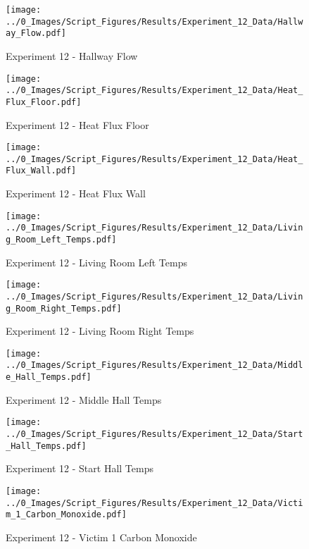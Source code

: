 	\begin{figure}[H]
		\centering
		\texttt{[image: ../0\_Images/Script\_Figures/Results/Experiment\_12\_Data/Hallway\_Flow.pdf]}
		\caption[]{Experiment 12 - Hallway Flow}
	\end{figure}
 
	\clearpage

	\begin{figure}[H]
		\centering
		\texttt{[image: ../0\_Images/Script\_Figures/Results/Experiment\_12\_Data/Heat\_Flux\_Floor.pdf]}
		\caption[]{Experiment 12 - Heat Flux Floor}
	\end{figure}
 

	\begin{figure}[H]
		\centering
		\texttt{[image: ../0\_Images/Script\_Figures/Results/Experiment\_12\_Data/Heat\_Flux\_Wall.pdf]}
		\caption[]{Experiment 12 - Heat Flux Wall}
	\end{figure}
 
	\clearpage

	\begin{figure}[H]
		\centering
		\texttt{[image: ../0\_Images/Script\_Figures/Results/Experiment\_12\_Data/Living\_Room\_Left\_Temps.pdf]}
		\caption[]{Experiment 12 - Living Room Left Temps}
	\end{figure}
 

	\begin{figure}[H]
		\centering
		\texttt{[image: ../0\_Images/Script\_Figures/Results/Experiment\_12\_Data/Living\_Room\_Right\_Temps.pdf]}
		\caption[]{Experiment 12 - Living Room Right Temps}
	\end{figure}
 
	\clearpage

	\begin{figure}[H]
		\centering
		\texttt{[image: ../0\_Images/Script\_Figures/Results/Experiment\_12\_Data/Middle\_Hall\_Temps.pdf]}
		\caption[]{Experiment 12 - Middle Hall Temps}
	\end{figure}
 

	\begin{figure}[H]
		\centering
		\texttt{[image: ../0\_Images/Script\_Figures/Results/Experiment\_12\_Data/Start\_Hall\_Temps.pdf]}
		\caption[]{Experiment 12 - Start Hall Temps}
	\end{figure}
 
	\clearpage

	\begin{figure}[H]
		\centering
		\texttt{[image: ../0\_Images/Script\_Figures/Results/Experiment\_12\_Data/Victim\_1\_Carbon\_Monoxide.pdf]}
		\caption[]{Experiment 12 - Victim 1 Carbon Monoxide}
	\end{figure}
 

